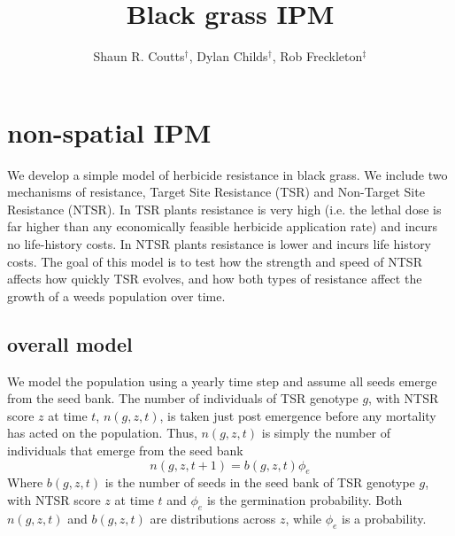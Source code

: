 \documentclass[12pt, a4paper]{article}
\begin{document}
\title{Black grass IPM}
\author{Shaun R. Coutts$^\dag$, Dylan Childs$^\dag$, Rob Freckleton$^\ddag$}
\maketitle
\section{non-spatial IPM}
We develop a simple model of herbicide resistance in black grass. We include two mechanisms of resistance, Target Site Resistance (TSR) and Non-Target Site Resistance (NTSR). In TSR plants resistance is very high (i.e. the lethal dose is far higher than any economically feasible herbicide application rate) and incurs no life-history costs. In NTSR plants resistance is lower and incurs life history costs. The goal of this model is to test how the strength and speed of NTSR affects how quickly TSR evolves, and how both types of resistance affect the growth of a weeds population over time.

\subsection{overall model}
We model the population using a yearly time step and assume all seeds emerge from the seed bank. The number of individuals of TSR genotype $g$, with NTSR score $z$ at time $t$, $n(g, z, t)$, is taken just post emergence before any mortality has acted on the population. Thus, $n(g, z, t)$ is simply the number of individuals that emerge from the seed bank    
\begin{equation}\label{eq:estab}
	n(g, z, t + 1) = b(g, z, t)\phi_e
\end{equation} 
Where $b(g, z, t)$ is the number of seeds in the seed bank of TSR genotype $g$, with NTSR score $z$ at time $t$ and $\phi_e$ is the germination probability. Both $n(g, z, t)$ and $b(g, z, t)$ are distributions across $z$, while $\phi_e$ is a probability.  
\end{document}
